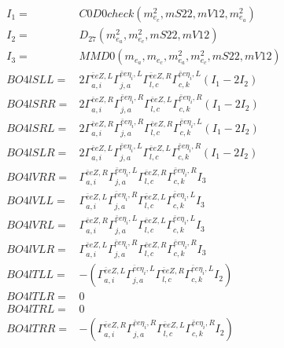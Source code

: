 \documentclass[A4,landscape]{article}
\begin{document}
\begin{align} 
I_1 = & C0D0check(m^2_{e_{{c}}}, mS22, mV12, m^2_{e_{{a}}}) \\ 
I_2 = & D_{27}(m^2_{e_{{a}}}, m^2_{e_{{c}}}, mS22, mV12) \\ 
I_3 = & MMD0(m_{e_{{a}}}, m_{e_{{c}}}, m^2_{e_{{a}}}, m^2_{e_{{c}}}, mS22, mV12) \\ 
  BO4lSLL= & 2  \Gamma^{\bar{e}e Z ,L}_{a, i} \Gamma^{\bar{e}e \eta_i ,L}_{j, a} \Gamma^{\bar{e}e Z ,R}_{l, c} \Gamma^{\bar{e}e \eta_i ,L}_{c, k} (I_1 - 2 I_2) \\ 
  BO4lSRR= & 2  \Gamma^{\bar{e}e Z ,R}_{a, i} \Gamma^{\bar{e}e \eta_i ,R}_{j, a} \Gamma^{\bar{e}e Z ,L}_{l, c} \Gamma^{\bar{e}e \eta_i ,R}_{c, k} (I_1 - 2 I_2) \\ 
  BO4lSRL= & 2  \Gamma^{\bar{e}e Z ,R}_{a, i} \Gamma^{\bar{e}e \eta_i ,R}_{j, a} \Gamma^{\bar{e}e Z ,R}_{l, c} \Gamma^{\bar{e}e \eta_i ,L}_{c, k} (I_1 - 2 I_2) \\ 
  BO4lSLR= & 2  \Gamma^{\bar{e}e Z ,L}_{a, i} \Gamma^{\bar{e}e \eta_i ,L}_{j, a} \Gamma^{\bar{e}e Z ,L}_{l, c} \Gamma^{\bar{e}e \eta_i ,R}_{c, k} (I_1 - 2 I_2) \\ 
  BO4lVRR= &  \Gamma^{\bar{e}e Z ,R}_{a, i} \Gamma^{\bar{e}e \eta_i ,L}_{j, a} \Gamma^{\bar{e}e Z ,R}_{l, c} \Gamma^{\bar{e}e \eta_i ,R}_{c, k} I_3 \\ 
  BO4lVLL= &  \Gamma^{\bar{e}e Z ,L}_{a, i} \Gamma^{\bar{e}e \eta_i ,R}_{j, a} \Gamma^{\bar{e}e Z ,L}_{l, c} \Gamma^{\bar{e}e \eta_i ,L}_{c, k} I_3 \\ 
  BO4lVRL= &  \Gamma^{\bar{e}e Z ,R}_{a, i} \Gamma^{\bar{e}e \eta_i ,L}_{j, a} \Gamma^{\bar{e}e Z ,L}_{l, c} \Gamma^{\bar{e}e \eta_i ,L}_{c, k} I_3 \\ 
  BO4lVLR= &  \Gamma^{\bar{e}e Z ,L}_{a, i} \Gamma^{\bar{e}e \eta_i ,R}_{j, a} \Gamma^{\bar{e}e Z ,R}_{l, c} \Gamma^{\bar{e}e \eta_i ,R}_{c, k} I_3 \\ 
  BO4lTLL= & -( \Gamma^{\bar{e}e Z ,L}_{a, i} \Gamma^{\bar{e}e \eta_i ,L}_{j, a} \Gamma^{\bar{e}e Z ,R}_{l, c} \Gamma^{\bar{e}e \eta_i ,L}_{c, k} I_2) \\ 
  BO4lTLR= & 0 \\ 
  BO4lTRL= & 0 \\ 
  BO4lTRR= & -( \Gamma^{\bar{e}e Z ,R}_{a, i} \Gamma^{\bar{e}e \eta_i ,R}_{j, a} \Gamma^{\bar{e}e Z ,L}_{l, c} \Gamma^{\bar{e}e \eta_i ,R}_{c, k} I_2) \\ 
\end{align} 
\end{document}

